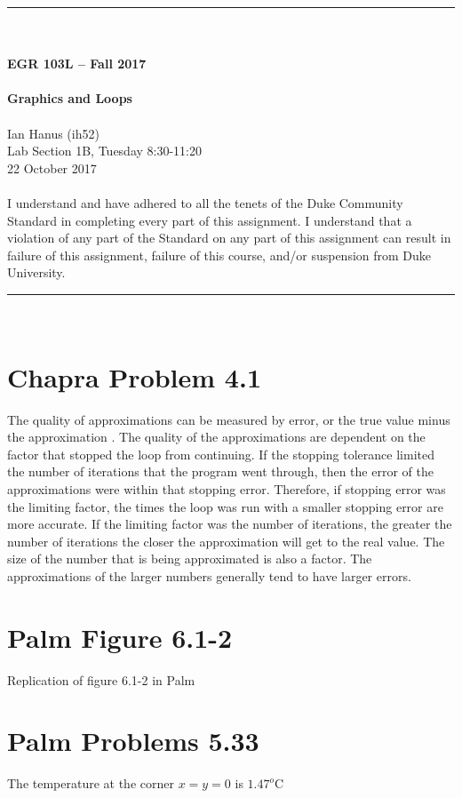\documentclass{article}
\begin{document}
\begin{center}
\rule{6.5in}{0.5mm}\\~\\
\textbf{\large EGR 103L -- Fall 2017}\\~\\
\textbf{\huge Graphics and Loops}\\~\\
Ian Hanus (ih52)\\
Lab Section 1B, Tuesday 8:30-11:20\\
22 October 2017\\~\\
{\small I understand and have adhered to all the tenets of the Duke
  Community Standard in completing every part of this assignment.  I
  understand that a violation of any part of the Standard on any part
  of this assignment can result in failure of this assignment, failure
  of this course, and/or suspension from Duke University.} 
\rule{6.5in}{0.5mm}\\
\end{center}
\tableofcontents
\listoffigures
\pagebreak
\section{Chapra Problem 4.1}
\begin{center}

\end{center}
The quality of approximations can be measured by error, or the true value minus the approximation \cite[p.~101]{Chapra}. The quality of the approximations are dependent on the factor that stopped the loop from continuing. If the stopping tolerance limited the number of iterations that the program went through, then the error of the approximations were within that stopping error. Therefore, if stopping error was the limiting factor, the times the loop was run with a smaller stopping error are more accurate. If the limiting factor was the number of iterations, the greater the number of iterations the closer the approximation will get to the real value. The size of the number that is being approximated is also a factor. The approximations of the larger numbers generally tend to have larger errors.
\section{Palm Figure 6.1-2}
Replication of figure 6.1-2 in Palm \cite[p.~265]{Palm}
\section{Palm Problems 5.33}
The temperature at the corner $x = y = 0$ is $1.47^o$C
\end{document}
